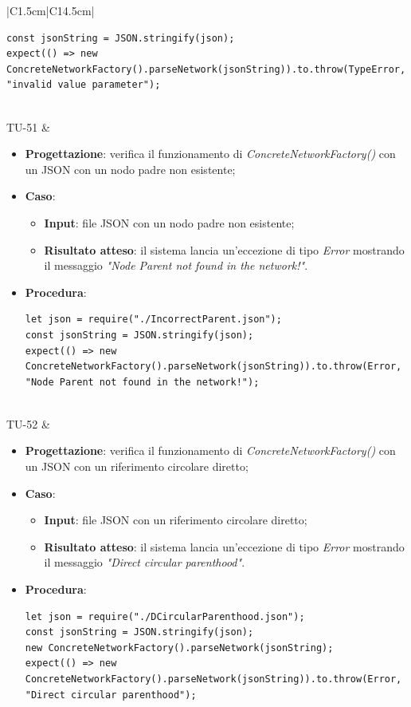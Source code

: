 \begin{longtable}{|C{1.5cm}|C{14.5cm}|}
\begin{itemize}
\begin{lstlisting}
const jsonString = JSON.stringify(json);
expect(() => new ConcreteNetworkFactory().parseNetwork(jsonString)).to.throw(TypeError, "invalid value parameter");
		\end{lstlisting}
	\end{itemize}\\
	\hline
	{TU-51} &
	\begin{itemize}
		\item \textbf{Progettazione}: verifica il funzionamento di \emph{ConcreteNetworkFactory()} con un JSON con un nodo padre non esistente;
		\item \textbf{Caso}: 
		\begin{itemize}
			\item \textbf{Input}: file JSON con un nodo padre non esistente;
			\item \textbf{Risultato atteso}: il sistema lancia un'eccezione di tipo \emph{Error} mostrando il messaggio \emph{"Node Parent not found in the network!"}.
		\end{itemize}
		\item \textbf{Procedura}:
		\begin{lstlisting}
let json = require("./IncorrectParent.json");
const jsonString = JSON.stringify(json);
expect(() => new ConcreteNetworkFactory().parseNetwork(jsonString)).to.throw(Error, "Node Parent not found in the network!");
		\end{lstlisting}
	\end{itemize}\\
	\hline
	{TU-52} &
	\begin{itemize}
		\item \textbf{Progettazione}: verifica il funzionamento di \emph{ConcreteNetworkFactory()} con un JSON con un riferimento circolare diretto;
		\item \textbf{Caso}: 
		\begin{itemize}
			\item \textbf{Input}: file JSON con un riferimento circolare diretto;
			\item \textbf{Risultato atteso}: il sistema lancia un'eccezione di tipo \emph{Error} mostrando il messaggio \emph{"Direct circular parenthood"}.
		\end{itemize}
		\item \textbf{Procedura}:
		\begin{lstlisting}
let json = require("./DCircularParenthood.json");
const jsonString = JSON.stringify(json);
new ConcreteNetworkFactory().parseNetwork(jsonString);
expect(() => new ConcreteNetworkFactory().parseNetwork(jsonString)).to.throw(Error, "Direct circular parenthood");

\end{lstlisting}
\end{itemize}
\end{longtable}
